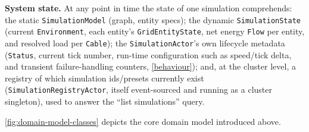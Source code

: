 \documentclass{scrreprt}
\begin{document}
\textbf{System state.} At any point in time the state of one simulation comprehends: the
static \texttt{SimulationModel} (graph, entity specs); the dynamic \texttt{SimulationState}
(current \texttt{Environment}, each entity's \texttt{GridEntityState}, net energy
\texttt{Flow} per entity, and resolved load per \texttt{Cable}); the \texttt{SimulationActor}'s
own lifecycle metadata (\texttt{Status}, current tick number, run-time configuration such as
speed/tick delta, and transient failure-handling counters, \cref{behaviour}); and, at the
cluster level, a registry of which simulation ids/presets currently exist
(\texttt{SimulationRegistryActor}, itself event-sourced and running as a cluster singleton), used
to answer the ``list simulations'' query.

\cref{fig:domain-model-classes} depicts the core domain model introduced above.
\end{document}

